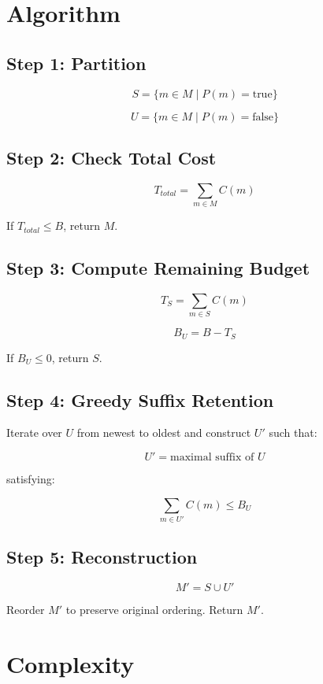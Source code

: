 \section{Algorithm}

\subsection*{Step 1: Partition}

\[ S = \{ m \in M \mid P(m) = \text{true} \} \]

\[ U = \{ m \in M \mid P(m) = \text{false} \} \]

\subsection*{Step 2: Check Total Cost}

\[ T_{total} = \sum_{m \in M} C(m) \]

If $T_{total} \leq B$, return $M$.

\subsection*{Step 3: Compute Remaining Budget}

\[ T_S = \sum_{m \in S} C(m) \]

\[ B_U = B - T_S \]

If $B_U \leq 0$, return $S$.

\subsection*{Step 4: Greedy Suffix Retention}

Iterate over $U$ from newest to oldest and construct $U'$ such that:

\[ U' = \text{maximal suffix of } U \]

satisfying:

\[ \sum_{m \in U'} C(m) \leq B_U \]

\subsection*{Step 5: Reconstruction}

\[ M' = S \cup U' \]

Reorder $M'$ to preserve original ordering. Return $M'$.

\section{Complexity}

